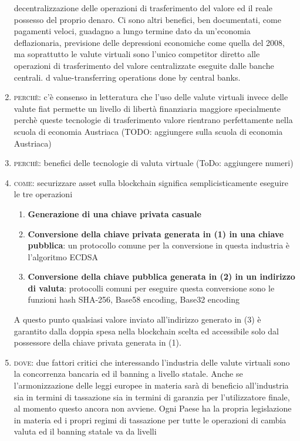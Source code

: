 \documentclass[11pt,fleqn,oneside]{book} %
\begin{document}
\begin{enumerate}
	decentralizzazione delle operazioni di trasferimento del valore ed il reale possesso del proprio denaro.
	Ci sono altri benefici, ben documentati, come pagamenti veloci, guadagno a lungo termine dato da un'economia deflazionaria, previsione
	delle depressioni economiche come quella del 2008, ma soprattutto le valute virtuali sono l'unico competitor diretto alle operazioni
	di trasferimento del valore centralizzate eseguite dalle banche centrali. d value-transferring operations done by central banks.
	\item \textsc{perchè}: c'è consenso in letteratura che l'uso delle valute virtuali invece delle valute fiat permette un livello di
	libertà finanziaria maggiore specialmente perchè queste tecnologie di trasferimento valore rientrano perfettamente nella scuola
	di economia Austriaca \cite{austrianTheory} (TODO: aggiungere sulla scuola di economia Austriaca)
	\item \textsc{perchè}: benefici delle tecnologie di valuta virtuale (ToDo: aggiungere numeri)
	\item \textsc{come}: securizzare asset sulla blockchain significa semplicisticamente eseguire le tre operazioni
		\begin{enumerate}[label*=\arabic*.]
			\item \textbf{Generazione di una chiave privata casuale}
			\item \textbf{Conversione della chiave privata generata in (1) in una chiave pubblica}: un protocollo comune per la conversione
			in questa industria è l'algoritmo ECDSA
			\item \textbf{Conversione della chiave pubblica generata in (2) in un indirizzo di valuta}: protocolli comuni per eseguire questa
			conversione sono le funzioni hash SHA-256, Base58 encoding, Base32 encoding
		\end{enumerate}
	A questo punto qualsiasi valore inviato all'indirizzo generato in (3) è garantito dalla doppia spesa nella blockchain scelta ed accessibile
	solo dal possessore della chiave privata generata in (1).
	\item \textsc{dove}: due fattori critici che interessando l'industria delle valute virtuali sono la concorrenza bancaria ed il 
	banning a livello statale. Anche se l'armonizzazione delle leggi europee in materia sarà di beneficio all'industria sia in termini di 
	tassazione sia in termini di garanzia per l'utilizzatore finale, al momento questo ancora non avviene. Ogni Paese ha la propria
	legislazione in materia ed i propri regimi di tassazione per tutte le operazioni di cambia valuta ed il banning statale va da livelli

\end{enumerate}
\end{document}

